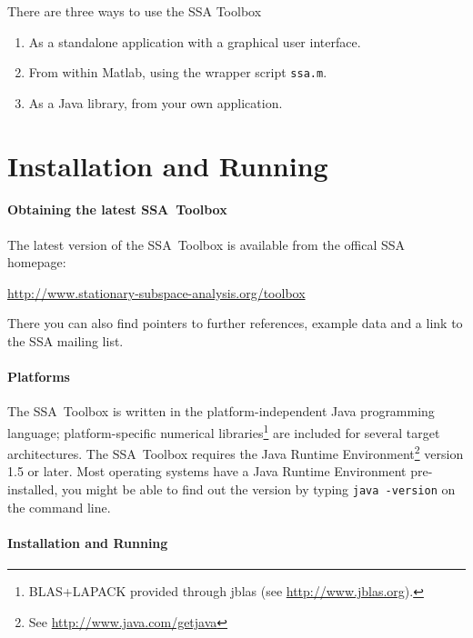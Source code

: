 \documentclass{article}
\newcommand{\1}{\ensuremath{\mathds{1}}}
\newcommand{\0}{\ensuremath{0}}
\begin{document}
There are three ways to use the SSA Toolbox
\begin{enumerate}
	\item As a standalone application with a graphical user interface. 
	 
	\item From within Matlab, using the wrapper script \texttt{ssa.m}. 

	\item As a Java library, from your own application.
\end{enumerate}


\section{Installation and Running}
\label{sec:install_run}

\paragraph{Obtaining the latest SSA~Toolbox}

The latest version of the SSA~Toolbox is available from the offical SSA homepage: 
\begin{center}
	\url{http://www.stationary-subspace-analysis.org/toolbox}
\end{center}
There you can also find pointers to further references, example data and a link 
to the SSA mailing list. 

\paragraph{Platforms}

The SSA~Toolbox is written in the platform-independent Java programming language; 
platform-specific numerical libraries\footnote{BLAS+LAPACK provided through
jblas (see \url{http://www.jblas.org}).} are included for several target architectures. 
The SSA~Toolbox requires the Java Runtime Environment\footnote{See 
\url{http://www.java.com/getjava}} version 1.5 or later. Most operating systems
have a Java Runtime Environment pre-installed, you might be able to find out 
the version by typing \texttt{java -version} on the command line. 

\paragraph{Installation and Running}
\end{document}
